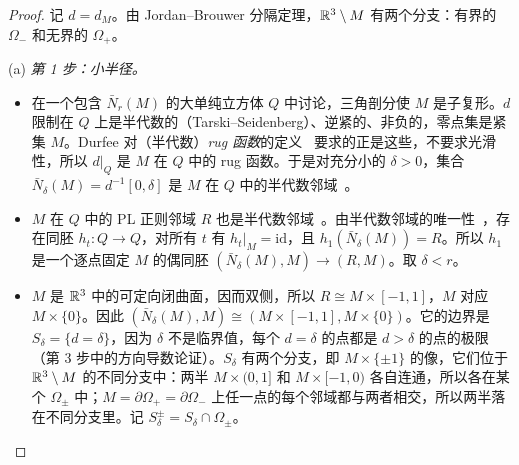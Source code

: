 \begin{proof}
记 $d=d_M$。由 Jordan--Brouwer 分隔定理，$\mathbb{R}^3\setminus M$ 有两个分支：有界的 $\Omega_-$ 和无界的 $\Omega_+$。

(a) \emph{第 1 步：小半径。}
\begin{itemize}
\item 在一个包含 $\bar N_r(M)$ 的大单纯立方体 $Q$ 中讨论，三角剖分使 $M$ 是子复形。$d$ 限制在 $Q$ 上是半代数的（Tarski--Seidenberg）、逆紧的、非负的，零点集是紧集 $M$。Durfee 对（半代数）\emph{rug 函数}的定义~\cite[Def.~3.1]{Durfee83} 要求的正是这些，不要求光滑性，所以 $d|_Q$ 是 $M$ 在 $Q$ 中的 rug 函数。于是对充分小的 $\delta>0$，集合 $\bar N_\delta(M)=d^{-1}[0,\delta]$ 是 $M$ 在 $Q$ 中的半代数邻域~\cite[Def.~3.4]{Durfee83}。
\item $M$ 在 $Q$ 中的 PL 正则邻域 $R$ 也是半代数邻域~\cite[Prop.~3.7]{Durfee83}。由半代数邻域的唯一性~\cite[Prop.~3.5]{Durfee83}，存在同胚 $h_t\colon Q\to Q$，对所有 $t$ 有 $h_t|_M=\mathrm{id}$，且 $h_1(\bar N_\delta(M))=R$。所以 $h_1$ 是一个逐点固定 $M$ 的偶同胚 $(\bar N_\delta(M),M)\to(R,M)$。取 $\delta<r$。
\item $M$ 是 $\mathbb{R}^3$ 中的可定向闭曲面，因而双侧，所以 $R\cong M\times[-1,1]$，$M$ 对应 $M\times\{0\}$。因此 $(\bar N_\delta(M),M)\cong(M\times[-1,1],M\times\{0\})$。它的边界是 $S_\delta=\{d=\delta\}$，因为 $\delta$ 不是临界值，每个 $d=\delta$ 的点都是 $d>\delta$ 的点的极限（第 3 步中的方向导数论证）。$S_\delta$ 有两个分支，即 $M\times\{\pm1\}$ 的像，它们位于 $\mathbb{R}^3\setminus M$ 的不同分支中：两半 $M\times(0,1]$ 和 $M\times[-1,0)$ 各自连通，所以各在某个 $\Omega_\pm$ 中；$M=\partial\Omega_+=\partial\Omega_-$ 上任一点的每个邻域都与两者相交，所以两半落在不同分支里。记 $S_\delta^\pm=S_\delta\cap\Omega_\pm$。
\end{itemize}


\end{proof}
